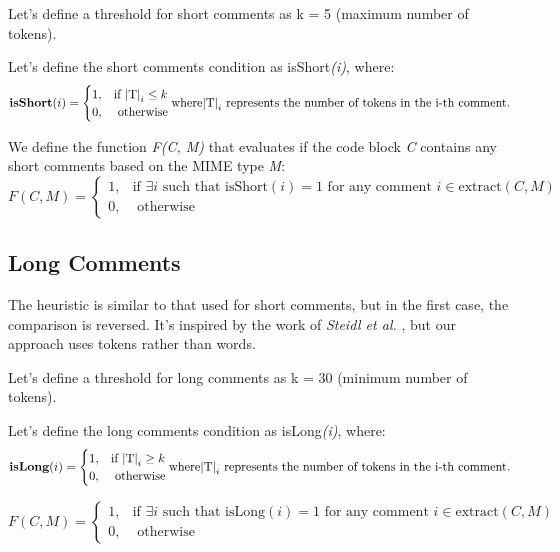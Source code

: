 \noindent Let's define a threshold for short comments as k = 5 (maximum number of tokens).

\noindent Let's define the short comments condition as isShort\textit{(i)}, where:
\begin{equation*}
	\textbf{isShort}(i) = \begin{cases}
		1, & \text{if } \mathrm{|T|}_{i} \le k \\
		0, & \text{ otherwise}
	\end{cases}
	
	\noindent \text{where} \mathrm{|T|}_{i} \text{ represents the number of tokens in the i-th comment.}
\end{equation*}

\noindent We define the function \textit{F(C, M)} that evaluates if the code block \textit{C} contains any short comments based on the MIME type \textit{M}:
\begin{equation*}
	F(C, M) = \begin{cases}
		1, & \text{if } \exists i \text{ such that } \text{isShort}(i) = 1 \text{ for any comment } i \in \text{extract}(C, M) \\
		0, & \text{ otherwise}
	\end{cases}
\end{equation*}

\subsection{Long Comments}
The heuristic is similar to that used for short comments, but in the first case, the comparison is reversed.
It's inspired by the work of \textit{Steidl et al.} \cite{steidl2013}, but our approach uses tokens rather than words.

\noindent Let's define a threshold for long comments as k = 30 (minimum number of tokens).

\noindent Let's define the long comments condition as isLong\textit{(i)}, where:
\begin{equation*}
	\textbf{isLong}(i) = \begin{cases}
		1, & \text{if } \mathrm{|T|}_{i} \ge k \\
		0, & \text{ otherwise}
	\end{cases}
	
	\noindent \text{where} \mathrm{|T|}_{i} \text{ represents the number of tokens in the i-th comment.}
\end{equation*}

\begin{equation*}
	F(C, M) = \begin{cases}
		1, & \text{if } \exists i \text{ such that } \text{isLong}(i) = 1 \text{ for any comment } i \in \text{extract}(C, M) \\
		0, & \text{ otherwise}
	\end{cases}
\end{equation*}

